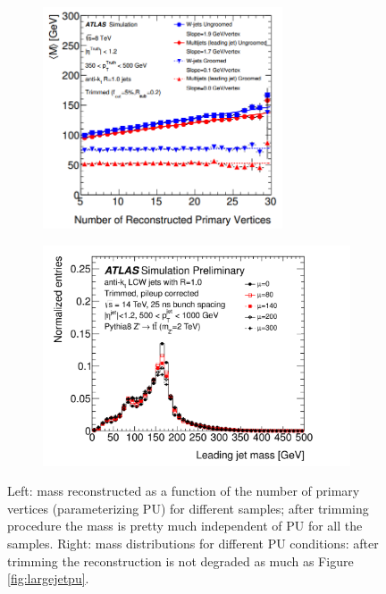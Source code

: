 \begin{figure}
    \centering
    \begin{subfigure}[b]{0.45\textwidth}
  \centering
        \includegraphics[width=0.78\textwidth]{jet_part/grooming/pileup.png}
 
    \end{subfigure}
    \begin{subfigure}[b]{0.45\textwidth}
  \centering
        \includegraphics[width=\textwidth]{jet_part/Jet_pileupcorrected_mass_pt_500.jpeg}
   
    \end{subfigure}
    \caption[Effect of pile-up before and after trimming]{Left: mass reconstructed as a function of the number of primary vertices (parameterizing PU) for different samples; after trimming procedure the mass is pretty much independent of PU for all the samples. Right: mass distributions for different PU conditions: after trimming the reconstruction is not degraded as much as Figure \ref{fig:largejetpu}.} 
    \label{fig:trimmingperformance}
\end{figure}


